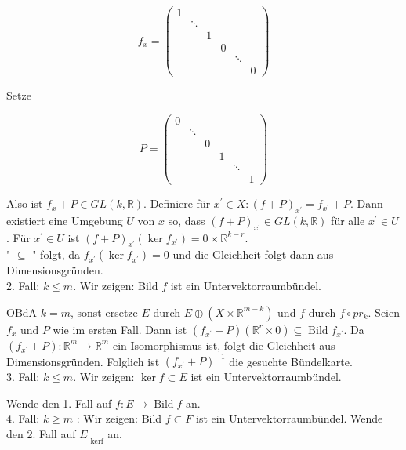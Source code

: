 \documentclass[10pt, letterpaper]{article}
\begin{document}
$$
f_{x}=\left(\begin{array}{cccccc}
1 & & & & & \\
& \ddots & & & & \\
& & 1 & & & \\
& & & 0 & & \\
& & & & \ddots & \\
& & & & & 0
\end{array}\right)
$$

Setze

$$
P=\left(\begin{array}{cccccc}
0 & & & & & \\
& \ddots & & & & \\
& & 0 & & & \\
& & & 1 & & \\
& & & & \ddots & \\
& & & & & 1
\end{array}\right)
$$

Also ist $f_{x}+P \in G L(k, \mathbb{R})$. Definiere für $x^{\prime} \in X:(f+P)_{x^{\prime}}=f_{x^{\prime}}+P$. Dann existiert eine Umgebung $U$ von $x$ so, dass $(f+P)_{x^{\prime}} \in G L(k, \mathbb{R})$ für alle $x^{\prime} \in U$. Für $x^{\prime} \in U$ ist $(f+P)_{x^{\prime}}\left(\operatorname{ker} f_{x^{\prime}}\right)=0 \times \mathbb{R}^{k-r}$.\\
" $\subseteq$ " folgt, da $f_{x^{\prime}}\left(\operatorname{ker} f_{x^{\prime}}\right)=0$ und die Gleichheit folgt dann aus Dimensionsgründen.\\
2. Fall: $k \leq m$. Wir zeigen: Bild $f$ ist ein Untervektorraumbündel.

OBdA $k=m$, sonst ersetze $E$ durch $E \oplus\left(X \times \mathbb{R}^{m-k}\right)$ und $f$ durch $f \circ p r_{k}$. Seien $f_{x}$ und $P$ wie im ersten Fall. Dann ist $\left(f_{x^{\prime}}+P\right)\left(\mathbb{R}^{r} \times 0\right) \subseteq \operatorname{Bild} f_{x^{\prime}}$. Da $\left(f_{x^{\prime}}+P\right): \mathbb{R}^{m} \rightarrow \mathbb{R}^{m}$ ein Isomorphismus ist, folgt die Gleichheit aus Dimensionsgründen. Folglich ist $\left(f_{x^{\prime}}+P\right)^{-1}$ die gesuchte Bündelkarte.\\
3. Fall: $k \leq m$. Wir zeigen: $\operatorname{ker} f \subset E$ ist ein Untervektorraumbündel.

Wende den 1. Fall auf $f: E \rightarrow \operatorname{Bild} f$ an.\\
4. Fall: $k \geq m$ : Wir zeigen: Bild $f \subset F$ ist ein Untervektorraumbündel. Wende den 2. Fall auf $\left.E\right|_{\operatorname{kerf}}$ an.
\end{document}
